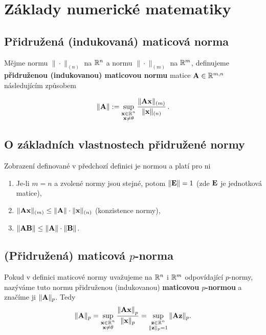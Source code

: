\section{Základy numerické matematiky}

\subsection*{Přidružená (indukovaná) maticová norma}

Mějme normu $\| \cdot \|_{(n)}$ na $\mathbb{R}^n$ a normu $\| \cdot \|_{(m)}$ na
$\mathbb{R}^m$, definujeme \textbf{přidruženou (indukovanou) maticovou normu} matice
$\mathbf{A} \in \mathbb{R}^{m,n}$ následujícím způsobem

\begin{equation*}
	\| \mathbf{A}\| := \sup_{\substack{\mathbf{x} \in \mathbb{R}^{n} \\ \mathbf{x} \neq \theta}} \frac{ \|\mathbf{A}\mathbf{x}\|_{(m)} }{\|\mathbf{x}\|_{(n)}}\,.
\end{equation*}

\subsection*{O základních vlastnostech přidružené normy}

Zobrazení definované v předchozí definici je normou a platí pro ni

\begin{enumerate}
	\item Je-li $m=n$ a zvolené normy jsou stejné, potom $\|\mathbf{E}\| = 1$ (zde $\mathbf{E}$ je
	      jednotková matice),
	\item $\|\mathbf{A}\mathbf{x}\|_{(m)} \leq \|\mathbf{A}\| \cdot \|\mathbf{x}\|_{(n)}$ (konzistence normy),
	\item $\|\mathbf{A}\mathbf{B}\| \leq \|\mathbf{A}\| \cdot \|\mathbf{B}\|$.
\end{enumerate}

\subsection*{(Přidružená) maticová $p$-norma}

Pokud v definici maticové normy uvažujeme na $\mathbb{R}^n$ i $\mathbb{R}^m$ odpovídající
$p$-normy, nazýváme tuto normu přidruženou (indukovanou) \textbf{maticovou
	$p$-normou} a značíme ji $\|\mathbf{A}\|_p$. Tedy
\[\| \mathbf{A}\|_p = \sup_{\substack{\mathbf{x} \in \mathbb{R}^{n} \\ \mathbf{x} \neq \theta}}  \frac{\left\|\mathbf{A} \mathbf{x}\right\|_{p} }{\|\mathbf{x}\|_{p}}
	= \sup_{\substack{\mathbf{z} \in \mathbb{R}^{n} \\ \|\mathbf{z}\|_{p} = 1}} \|\mathbf{A}\mathbf{z}\|_{p}.\]

